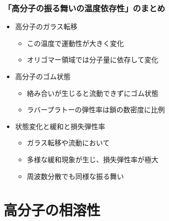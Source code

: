 \documentclass[unicode,12pt]{beamer}%
\begin{document}
\begin{frame}
	\frametitle{「高分子の振る舞いの温度依存性」のまとめ}
        \begin{boxnote}
            \vspace{-3mm}
            \begin{itemize}
                \item 高分子のガラス転移
                    \begin{itemize}
                        \item この温度で運動性が大きく変化
                        \item オリゴマー領域では分子量に依存して変化
                    \end{itemize} 
                \item 高分子のゴム状態
                    \begin{itemize}
                        \item 絡み合いが生じると流動できずにゴム状態
                        \item ラバープラトーの弾性率は鎖の数密度に比例
                    \end{itemize} 
                \item 状態変化と緩和と損失弾性率
                    \begin{itemize}
                        \item ガラス転移や流動において
                        \item 多様な緩和現象が生じ、損失弾性率が極大
                        \item 周波数分散でも同様な振る舞い
                    \end{itemize}
            \end{itemize}
        \end{boxnote}
\end{frame}

\section{高分子の相溶性}
\end{document}
